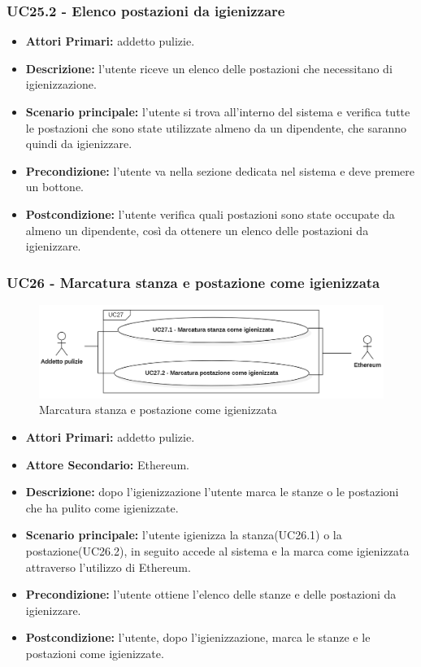 \subsubsection{UC25.2 - Elenco postazioni da igienizzare}
\begin{itemize}
           	\item\textbf{Attori Primari:} addetto pulizie.
           	\item\textbf{Descrizione:} l'utente riceve un elenco delle postazioni che necessitano di igienizzazione.
           	\item\textbf{Scenario principale:} l'utente si trova all'interno del sistema e verifica tutte le postazioni che sono state utilizzate almeno da un dipendente, che saranno quindi da igienizzare.
           	\item\textbf{Precondizione:} l'utente va nella sezione dedicata nel sistema e deve premere un bottone.
           	\item\textbf{Postcondizione:} l'utente verifica quali postazioni sono state occupate da almeno un dipendente, così da ottenere un elenco delle postazioni da igienizzare.
\end{itemize}

\subsubsection{ UC26 - Marcatura stanza e postazione come igienizzata}
\begin{figure}[H]
		\centering
		\includegraphics[width=18cm]{res/images/UC26.png}
		\caption{Marcatura stanza e postazione come igienizzata}
		\label{fig:Marcatura stanza e postazione come igienizzata}
	\end{figure}
\begin{itemize}
           	\item\textbf{Attori Primari:} addetto pulizie.
		\item\textbf{Attore Secondario:} Ethereum.
           	\item\textbf{Descrizione:} dopo l'igienizzazione l'utente marca le stanze o le postazioni che ha pulito come igienizzate.
           	\item\textbf{Scenario principale:} l'utente igienizza la stanza(UC26.1) o la postazione(UC26.2), in seguito accede al sistema e la marca come igienizzata attraverso l'utilizzo di Ethereum.
           	\item\textbf{Precondizione:} l'utente ottiene l'elenco delle stanze e delle postazioni da igienizzare.
           	\item\textbf{Postcondizione:} l'utente, dopo l'igienizzazione, marca le stanze e le postazioni come igienizzate.
\end{itemize}
